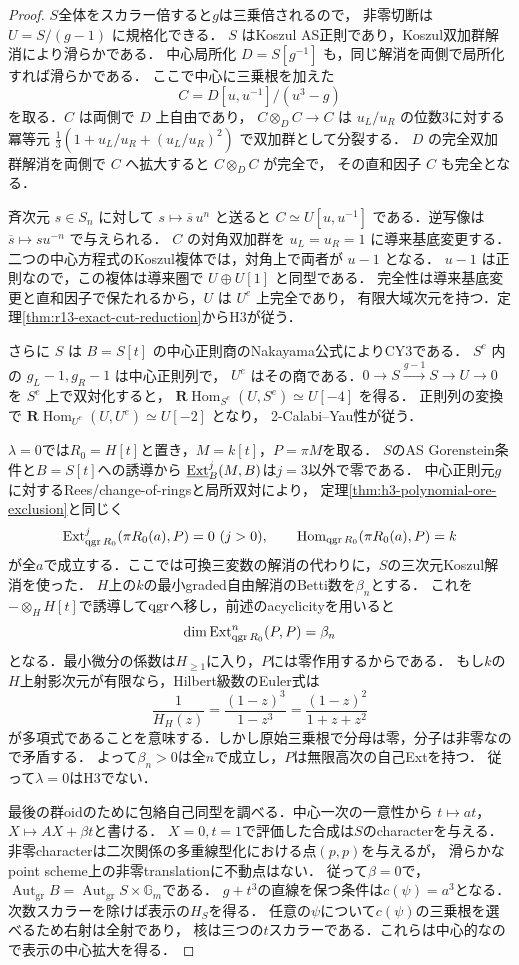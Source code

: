 \begin{proof}
$S$全体をスカラー倍すると$g$は三乗倍されるので，
非零切断は $U=S/(g-1)$ に規格化できる．
$S$ はKoszul AS正則であり，Koszul双加群解消により滑らかである．
中心局所化 $D=S[g^{-1}]$ も，同じ解消を両側で局所化すれば滑らかである．
ここで中心に三乗根を加えた
\[
 C=D[u,u^{-1}]/(u^3-g)
\]
を取る．$C$ は両側で $D$ 上自由であり，
$C\otimes_D C\to C$ は $u_L/u_R$ の位数3に対する冪等元
$\tfrac13(1+u_L/u_R+(u_L/u_R)^2)$ で双加群として分裂する．
$D$ の完全双加群解消を両側で $C$ へ拡大すると $C\otimes_D C$ が完全で，
その直和因子 $C$ も完全となる．

斉次元 $s\in S_n$ に対して $s\mapsto \overline s\,u^n$ と送ると
$C\simeq U[u,u^{-1}]$ である．逆写像は $\overline s\mapsto s u^{-n}$ で与えられる．
$C$ の対角双加群を $u_L=u_R=1$ に導来基底変更する．
二つの中心方程式のKoszul複体では，対角上で両者が $u-1$ となる．
$u-1$ は正則なので，この複体は導来圏で $U\oplus U[1]$ と同型である．
完全性は導来基底変更と直和因子で保たれるから，$U$ は $U^e$ 上完全であり，
有限大域次元を持つ．定理\ref{thm:r13-exact-cut-reduction}からH3が従う．

さらに $S$ は $B=S[t]$ の中心正則商のNakayama公式によりCY3である．
$S^e$ 内の $g_L-1,g_R-1$ は中心正則列で，
$U^e$ はその商である．$0\to S\xrightarrow{g-1}S\to U\to0$
を $S^e$ 上で双対化すると，
$\mathbf R\operatorname{Hom}_{S^e}(U,S^e)\simeq U[-4]$ を得る．
正則列の変換で
$\mathbf R\operatorname{Hom}_{U^e}(U,U^e)\simeq U[-2]$ となり，
2-Calabi--Yau性が従う．

$\lambda=0$では$R_0=H[t]$と置き，$M=k[t]$，$P=\pi M$を取る．
$S$のAS Gorenstein条件と$B=S[t]$への誘導から
$\underline{\operatorname{Ext}}_B^j(M,B)$は$j=3$以外で零である．
中心正則元$g$に対するRees/change-of-ringsと局所双対により，
定理\ref{thm:h3-polynomial-ore-exclusion}と同じく
\[
 \Ext^j_{\qgr R_0}(\pi R_0(a),P)=0\ (j>0),\qquad
 \Hom_{\qgr R_0}(\pi R_0(a),P)=k
\]
が全$a$で成立する．ここでは可換三変数の解消の代わりに，$S$の三次元Koszul解消を使った．
$H$上の$k$の最小graded自由解消のBetti数を$\beta_n$とする．
これを$-\otimes_HH[t]$で誘導して$\operatorname{qgr}$へ移し，前述のacyclicityを用いると
\[
 \dim\operatorname{Ext}^n_{\operatorname{qgr} R_0}(P,P)=\beta_n
\]
となる．最小微分の係数は$H_{\ge1}$に入り，$P$には零作用するからである．
もし$k$の$H$上射影次元が有限なら，Hilbert級数のEuler式は
\[
 \frac1{H_H(z)}=\frac{(1-z)^3}{1-z^3}
              =\frac{(1-z)^2}{1+z+z^2}
\]
が多項式であることを意味する．しかし原始三乗根で分母は零，分子は非零なので矛盾する．
よって$\beta_n>0$は全$n$で成立し，$P$は無限高次の自己Extを持つ．
従って$\lambda=0$はH3でない．

最後の群oidのために包絡自己同型を調べる．中心一次の一意性から
$t\mapsto at$，$X\mapsto A X+\beta t$と書ける．
$X=0,t=1$で評価した合成は$S$のcharacterを与える．
非零characterは二次関係の多重線型化における点$(p,p)$を与えるが，
滑らかなpoint scheme上の非零translationに不動点はない．
従って$\beta=0$で，$\operatorname{Aut}_{\mathrm{gr}}B
=\operatorname{Aut}_{\mathrm{gr}}S\times\mathbb G_m$である．
$g+t^3$の直線を保つ条件は$c(\psi)=a^3$となる．
次数スカラーを除けば表示の$H_S$を得る．
任意の$\psi$について$c(\psi)$の三乗根を選べるため右射は全射であり，
核は三つの$t$スカラーである．これらは中心的なので表示の中心拡大を得る．
\end{proof}

